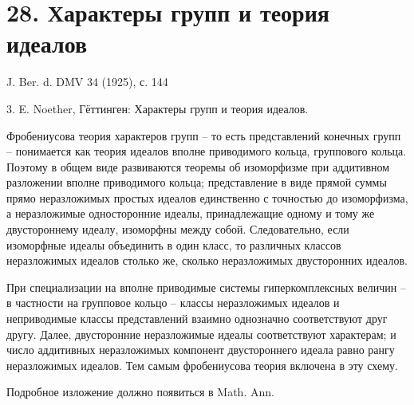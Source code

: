 \documentclass[11pt]{article}
\begin{document}
\section*{28. Характеры групп и теория идеалов}

\begin{center}
J. Ber. d. DMV 34 (1925), с. 144
\end{center}

3. E. Noether, Гёттинген: Характеры групп и теория идеалов.

Фробениусова теория характеров групп -- то есть представлений конечных групп -- понимается как теория идеалов вполне приводимого кольца, группового кольца. Поэтому в общем виде развиваются теоремы об изоморфизме при аддитивном разложении вполне приводимого кольца; представление в виде прямой суммы прямо неразложимых простых идеалов единственно с точностью до изоморфизма, а неразложимые односторонние идеалы, принадлежащие одному и тому же двустороннему идеалу, изоморфны между собой. Следовательно, если изоморфные идеалы объединить в один класс, то различных классов неразложимых идеалов столько же, сколько неразложимых двусторонних идеалов.

При специализации на вполне приводимые системы гиперкомплексных величин -- в частности на групповое кольцо -- классы неразложимых идеалов и неприводимые классы представлений взаимно однозначно соответствуют друг другу. Далее, двусторонние неразложимые идеалы соответствуют характерам; и число аддитивных неразложимых компонент двустороннего идеала равно рангу неразложимых идеалов. Тем самым фробениусова теория включена в эту схему.

Подробное изложение должно появиться в Math. Ann.
\end{document}
